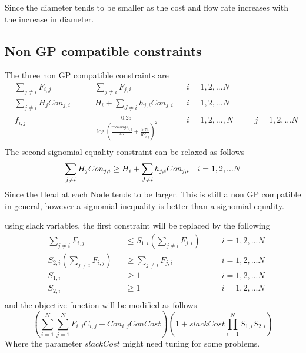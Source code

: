 \documentclass[12pt]{article}
\begin{document}
	Since the diameter tends to be smaller as the cost and flow rate increases with the increase in diameter.
	
	\subsection{Non GP compatible constraints}
	The three non GP compatible constraints are 
	\begin{equation}
	\begin{aligned}
	& \sum_{j \neq i} F_{i,j} && = \sum_{j \neq i} F_{j,i} \quad && i = 1, 2, ... N\\
	& \sum_{j \neq i} H_j Con_{j,i} && = H_i + \sum_{J \neq i} h_{j,i}Con_{j,i} && i = 1,2, ...N\\
	& f_{i,j} &&= \frac{0.25}{\log\left(\frac{relRough_{i,j}}{3.7} + \frac{5.74}{Re_{i,j}^{0.9}}\right)^2} && i = 1, 2, ..., N \quad && j = 1, 2, ... N\\
	\end{aligned}
	\end{equation}
	The second signomial equality constraint can be relaxed as follows
	\begin{equation}
	\sum_{j \neq i} H_j Con_{j,i} \geq H_i + \sum_{J \neq i} h_{j,i}Con_{j,i} \quad i = 1,2, ...N\\
	\end{equation}
	Since the Head at each Node tends to be larger. This is still a non GP compatible in general, however a signomial inequality is better than a signomial equality.
	
	using slack variables, the first constraint will be replaced by the following
	\begin{equation}
	\begin{aligned}
	& \sum_{j \neq i} F_{i,j} && \leq S_{1,i}(\sum_{j \neq i} F_{j,i}) \quad && i = 1, 2, ... N\\
	& S_{2,i}(\sum_{j \neq i} F_{i,j}) && \geq \sum_{j \neq i} F_{j,i} \quad && i = 1, 2, ... N\\
	& S_{1,i} && \geq 1 \quad && i = 1, 2, ... N\\
	& S_{2,i} && \geq 1 \quad && i = 1, 2, ... N\\
	\end{aligned}
	\end{equation}
	and the objective function will be modified as follows
	\begin{equation}
	(\sum_{i=1}^{N}\sum_{j=1}^{N} F_{i,j} C_{i,j} + Con_{i,j} ConCost)(1 + slackCost \prod_{i=1}^{N}S_{1,i}S_{2,i})
	\end{equation}
	Where the parameter $slackCost$ might need tuning for some problems.
	
\end{document}
